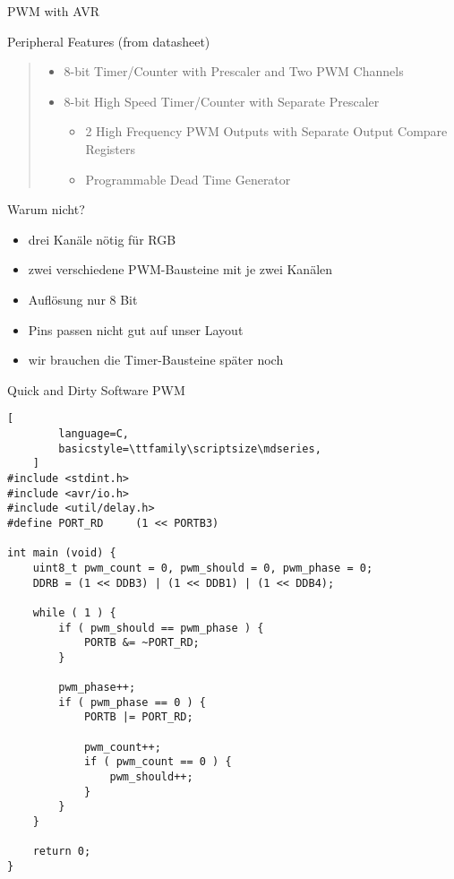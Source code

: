 \documentclass{beamer}
\begin{document}
\begin{frame}{PWM with AVR}
    \begin{block}{Peripheral Features (from datasheet)}
        \begin{quote}
            \begin{itemize}
                \item 8-bit Timer/Counter with Prescaler and Two PWM Channels
                \item 8-bit High Speed Timer/Counter with Separate Prescaler
                    \begin{itemize}
                        \item 2 High Frequency PWM Outputs with Separate Output Compare Registers
                        \item Programmable Dead Time Generator
                    \end{itemize}
            \end{itemize}
        \end{quote}
    \end{block}
    \pause
    \begin{block}{Warum nicht?}
        \begin{itemize}
            \item drei Kanäle nötig für RGB
            \item zwei verschiedene PWM-Bausteine mit je zwei Kanälen
            \item Auflösung nur 8 Bit
            \item Pins passen nicht gut auf unser Layout
            \item wir brauchen die Timer-Bausteine später noch
        \end{itemize}
    \end{block}
\end{frame}

\begin{frame}[fragile]{Quick and Dirty Software PWM}
    \begin{lstlisting}[
        language=C,
        basicstyle=\ttfamily\scriptsize\mdseries,
    ]
#include <stdint.h>
#include <avr/io.h>
#include <util/delay.h>
#define PORT_RD     (1 << PORTB3)

int main (void) {
    uint8_t pwm_count = 0, pwm_should = 0, pwm_phase = 0;
    DDRB = (1 << DDB3) | (1 << DDB1) | (1 << DDB4);

    while ( 1 ) {
        if ( pwm_should == pwm_phase ) {
            PORTB &= ~PORT_RD;
        }

        pwm_phase++;
        if ( pwm_phase == 0 ) {
            PORTB |= PORT_RD;

            pwm_count++;
            if ( pwm_count == 0 ) {
                pwm_should++;
            }
        }
    }

    return 0;
}
    \end{lstlisting}
\end{frame}
\end{document}
